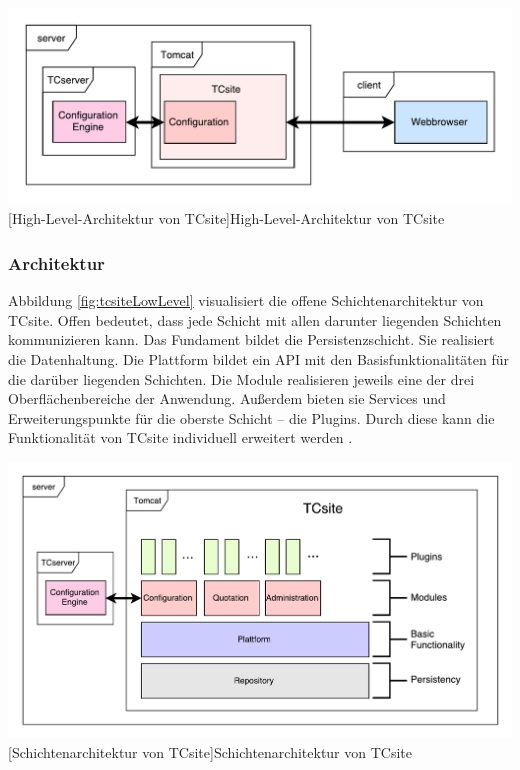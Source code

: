 \documentclass[11pt, a4paper, titlepage, listof=totoc, bibliography=totoc, index=totoc, twoside, openright, headings=normal]{scrreprt}
\begin{document}
\vspace{1em}
\begin{minipage}{\linewidth}
	\centering
	\includegraphics[width=1\linewidth]{Abbildungen/tcsiteHighLevel.pdf}
	[High-Level-Architektur von TCsite]{High-Level-Architektur von TCsite}
	\label{fig:tcsiteHighLevel}
\end{minipage}
\vspace{0.3em}

\subsubsection{Architektur}
\label{TCsiteArchitektur}

Abbildung \ref{fig:tcsiteLowLevel} visualisiert die offene Schichtenarchitektur von TCsite. Offen bedeutet, dass jede Schicht mit allen darunter liegenden Schichten kommunizieren kann. Das Fundament bildet die Persistenzschicht. Sie realisiert die Datenhaltung. Die Plattform bildet ein \ac{API} mit den Basisfunktionalitäten für die darüber liegenden Schichten. Die Module realisieren jeweils eine der drei Oberflächenbereiche der Anwendung. Außerdem bieten sie Services und Erweiterungspunkte für die oberste Schicht -- die Plugins. Durch diese kann die Funktionalität von TCsite individuell erweitert werden \citep{tactonTCsiteDevelopmentManual}.

\vspace{1em}
\begin{minipage}{\linewidth}
	\centering
	\includegraphics[width=1\linewidth]{Abbildungen/tcsiteLowLevel.pdf}
	[Schichtenarchitektur von TCsite]{Schichtenarchitektur von TCsite}
	\label{fig:tcsiteLowLevel}
\end{minipage}
\vspace{0.3em}
\end{document}
